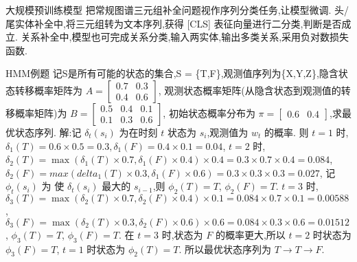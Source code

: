 \documentclass[10pt, utf8]{ctexart}
\begin{document}
\begin{multicols}{4}
    {\color{blue}大规模预训练模型}
    把常规图谱三元组补全问题视作序列分类任务,让模型微调.
    头/尾实体补全中,将三元组转为文本序列,获得 [CLS] 表征向量进行二分类,判断是否成立.
    关系补全中,模型也可完成关系分类,输入两实体,输出多类关系,采用负对数损失函数.

    {\color{orange_}HMM例题}
    记S是所有可能的状态的集合,S = \{T,F\},观测值序列为\{X,Y,Z\},隐含状态转移概率矩阵为 $A = \left[\begin{smallmatrix} 0.7 & 0.3 \\ 0.4 & 0.6 \end{smallmatrix}\right]$,
    观测状态概率矩阵(从隐含状态到观测值的转移概率矩阵)为 $B = \left[\begin{smallmatrix} 0.5 & 0.4 & 0.1 \\ 0.1 & 0.3 & 0.6 \end{smallmatrix}\right]$,
    初始状态概率分布为 $\pi = \left[\begin{smallmatrix} 0.6 & 0.4 \end{smallmatrix}\right]$,求最优状态序列.
    {\color{blue}解:}记 $\delta_t(s_i)$ 为在时刻 $t$ 状态为 $s_i$,观测值为 $w_t$ 的概率.
    则 $t = 1$ 时, $\delta_1(T) = 0.6 \times 0.5 = 0.3,\delta_1(F) = 0.4 \times 0.1 = 0.04$,
    $t = 2$ 时, $\delta_2(T) = \max(\delta_1(T) \times 0.7, \delta_1(F) \times 0.4) \times 0.4 = 0.3 \times 0.7 \times 0.4 = 0.084$,
    $\delta_2(F) = max(delta_1(T) \times 0.3, \delta_1(F) \times 0.6) = 0.3 \times 0.3 \times 0.3 = 0.027$,
    记 $\phi_t(s_i)$ 为 使 $\delta_t(s_i)$ 最大的 $s_{i-1}$,则 $\phi_2(T) = T$, $\phi_2(F) = T$.
    $ t = 3$ 时, $\delta_3(T) = \max(\delta_2(T) \times 0.7, \delta_2(F) \times 0.4) \times 0.1 = 0.084 \times 0.7 \times 0.1 = 0.00588$,
    $\delta_3(F) = \max(\delta_2(T) \times 0.3, \delta_2(F) \times 0.6) \times 0.6 = 0.084 \times 0.3 \times 0.6 = 0.01512$,
    $\phi_3(T) = T$, $\phi_3(F) = T$.
    在 $t = 3$ 时,状态为 $F$ 的概率更大,所以 $t = 2$ 时状态为 $\phi_3(F) = T$, $t = 1$ 时状态为 $\phi_2(T) = T$.
    所以最优状态序列为 $T \to T \to F$.


\end{multicols}
\end{document}
